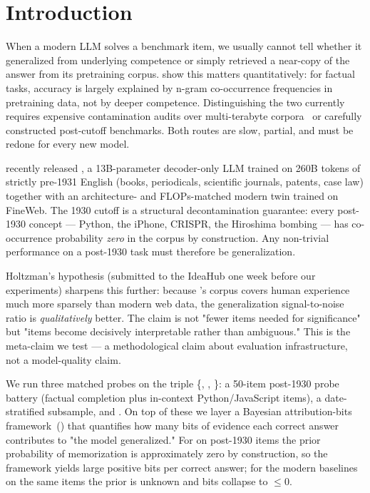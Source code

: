 \section{Introduction}
\label{sec:intro}

When a modern LLM solves a benchmark item, we usually cannot tell whether it generalized from underlying competence or simply retrieved a near-copy of the answer from its pretraining corpus. \citet{wang2025generalization} show this matters quantitatively: for factual tasks, accuracy is largely explained by n-gram co-occurrence frequencies in pretraining data, not by deeper competence. Distinguishing the two currently requires expensive contamination audits over multi-terabyte corpora~\citep{lee2021deduplicating,wu2024antileak} or carefully constructed post-cutoff benchmarks. Both routes are slow, partial, and must be redone for every new model.

 \citet{talkielm2026} recently released \talkienineteen, a 13B-parameter decoder-only LLM trained on 260B tokens of strictly pre-1931 English (books, periodicals, scientific journals, patents, case law) together with an architecture- and FLOPs-matched modern twin \talkieweb trained on FineWeb. The 1930 cutoff is a structural decontamination guarantee: every post-1930 concept --- Python, the iPhone, CRISPR, the Hiroshima bombing --- has co-occurrence probability \emph{zero} in the corpus by construction. Any non-trivial \talkienineteen performance on a post-1930 task must therefore be generalization.

 Holtzman's hypothesis (submitted to the IdeaHub one week before our experiments) sharpens this further: because \talkienineteen's corpus covers human experience much more sparsely than modern web data, the generalization signal-to-noise ratio is \emph{qualitatively} better. The claim is not "fewer items needed for significance" but "items become decisively interpretable rather than ambiguous." This is the meta-claim we test --- a methodological claim about evaluation infrastructure, not a model-quality claim.

 We run three matched probes on the triple \{\talkienineteen, \talkieweb, \gptfour\}: a 50-item post-1930 probe battery (factual completion plus in-context Python/JavaScript items), a date-stratified \mmlu subsample, and \humaneval. On top of these we layer a Bayesian attribution-bits framework~() that quantifies how many bits of evidence each correct answer contributes to "the model generalized." For \talkienineteen on post-1930 items the prior probability of memorization is approximately zero by construction, so the framework yields large positive bits per correct answer; for the modern baselines on the same items the prior is unknown and bits collapse to $\le 0$.

